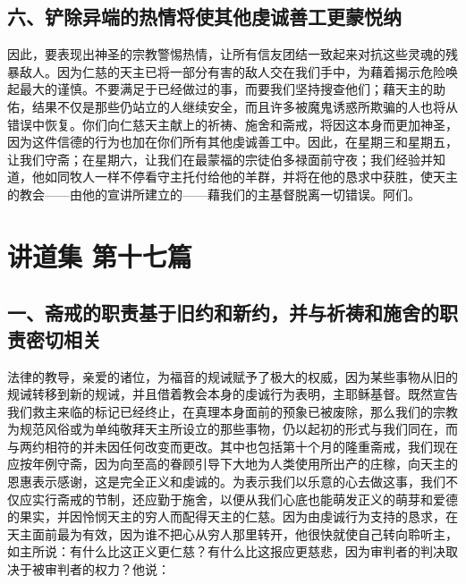 
\subsection{六、铲除异端的热情将使其他虔诚善工更蒙悦纳}

因此，要表现出神圣的宗教警惕热情，让所有信友团结一致起来对抗这些灵魂的残暴敌人。因为仁慈的天主已将一部分有害的敌人交在我们手中，为藉着揭示危险唤起最大的谨慎。不要满足于已经做过的事，而要我们坚持搜查他们；藉天主的助佑，结果不仅是那些仍站立的人继续安全，而且许多被魔鬼诱惑所欺骗的人也将从错误中恢复。你们向仁慈天主献上的祈祷、施舍和斋戒，将因这本身而更加神圣，因为这件信德的行为也加在你们所有其他虔诚善工中。因此，在星期三和星期五，让我们守斋；在星期六，让我们在最蒙福的宗徒伯多禄面前守夜；我们经验并知道，他如同牧人一样不停看守主托付给他的羊群，并将在他的恳求中获胜，使天主的教会——由他的宣讲所建立的——藉我们的主基督脱离一切错误。阿们。\par



\section{讲道集 第十七篇}

\par


\subsection{一、斋戒的职责基于旧约和新约，并与祈祷和施舍的职责密切相关}

法律的教导，亲爱的诸位，为福音的规诫赋予了极大的权威，因为某些事物从旧的规诫转移到新的规诫，并且借着教会本身的虔诚行为表明，主耶稣基督。既然宣告我们救主来临的标记已经终止，在真理本身面前的预象已被废除，那么我们的宗教为规范风俗或为单纯敬拜天主所设立的那些事物，仍以起初的形式与我们同在，而与两约相符的并未因任何改变而更改。其中也包括第十个月的隆重斋戒，我们现在应按年例守斋，因为向至高的眷顾引导下大地为人类使用所出产的庄稼，向天主的恩惠表示感谢，这是完全正义和虔诚的。为表示我们以乐意的心去做这事，我们不仅应实行斋戒的节制，还应勤于施舍，以便从我们心底也能萌发正义的萌芽和爱德的果实，并因怜悯天主的穷人而配得天主的仁慈。因为由虔诚行为支持的恳求，在天主面前最为有效，因为谁不把心从穷人那里转开，他很快就使自己转向聆听主，如主所说：有什么比这正义更仁慈？有什么比这报应更慈悲，因为审判者的判决取决于被审判者的权力？他说：\par

